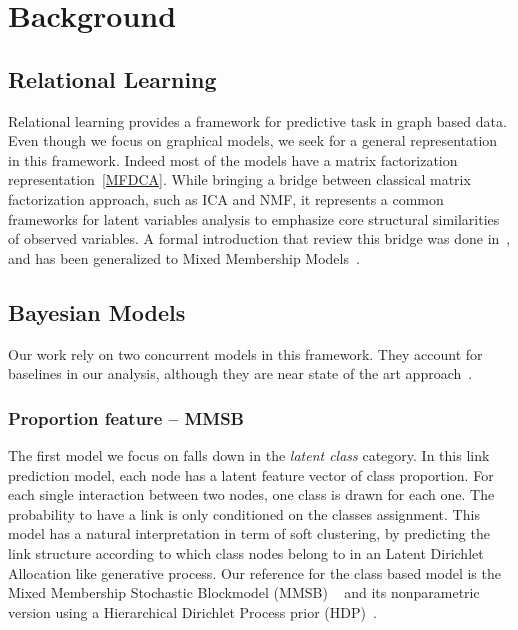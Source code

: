 \section{Background}

\subsection{Relational Learning}
Relational learning provides a framework for predictive task in graph based data. Even though we focus on  graphical models, we seek for a general representation in this framework. Indeed most of the models have a matrix factorization representation~\ref{MFDCA}. While bringing a bridge between classical matrix factorization approach, such as ICA and NMF, it represents a common frameworks for latent variables analysis to emphasize core structural similarities of observed variables. A formal introduction that review this bridge was done in~\cite{DCA}, and has been generalized to Mixed Membership Models~\cite{MMM}.

\subsection{Bayesian Models}
Our work rely on two concurrent models in this framework. They account for baselines in our analysis, although they are near state of the art approach~\cite{ILAM, EMMSB}.

\subsubsection{Proportion feature -- MMSB}
The first model we focus on falls down in the \emph{latent class} category. In this link prediction model, each node has a latent feature vector of class proportion. For each single interaction between two nodes, one class is drawn for each one. The probability to have a link is only conditioned on the classes assignment. This model has a natural interpretation in term of soft clustering, by predicting the link structure according to which class nodes belong to in an Latent Dirichlet Allocation like generative process. Our reference for the class based model is the Mixed Membership Stochastic Blockmodel (MMSB) ~\cite{MMSB} and its nonparametric version using a Hierarchical Dirichlet Process prior (HDP)~\cite{HDP}.~\\


